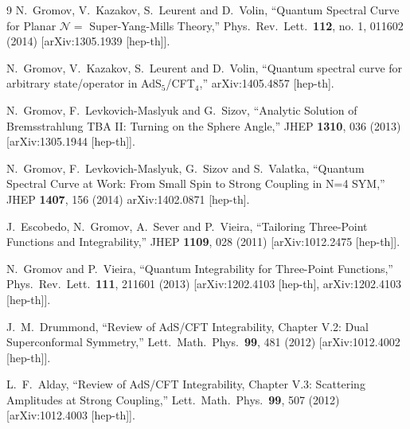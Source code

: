\documentclass[a4paper,11pt]{article}
\numberwithin{equation}{section}
\begin{document}
\begin{thebibliography} {9}
  N.~Gromov, V.~Kazakov, S.~Leurent and D.~Volin,
  ``Quantum Spectral Curve for Planar $\mathcal{N} =$ Super-Yang-Mills Theory,''
  Phys.\ Rev.\ Lett.\  {\bf 112}, no. 1, 011602 (2014)
  [arXiv:1305.1939 [hep-th]].

  N.~Gromov, V.~Kazakov, S.~Leurent and D.~Volin,
  ``Quantum spectral curve for arbitrary state/operator in AdS$_5$/CFT$_4$,''
  arXiv:1405.4857 [hep-th].

  N.~Gromov, F.~Levkovich-Maslyuk and G.~Sizov,
  ``Analytic Solution of Bremsstrahlung TBA II: Turning on the Sphere Angle,''
  JHEP {\bf 1310}, 036 (2013)
  [arXiv:1305.1944 [hep-th]].

  N.~Gromov, F.~Levkovich-Maslyuk, G.~Sizov and S.~Valatka,
  ``Quantum Spectral Curve at Work: From Small Spin to Strong Coupling in N=4 SYM,''
  JHEP {\bf 1407}, 156 (2014)
  arXiv:1402.0871 [hep-th].

  J.~Escobedo, N.~Gromov, A.~Sever and P.~Vieira,
  ``Tailoring Three-Point Functions and Integrability,''
  JHEP {\bf 1109}, 028 (2011)
  [arXiv:1012.2475 [hep-th]].

  N.~Gromov and P.~Vieira,
  ``Quantum Integrability for Three-Point Functions,''
  Phys.\ Rev.\ Lett.\  {\bf 111}, 211601 (2013)
  [arXiv:1202.4103 [hep-th], arXiv:1202.4103 [hep-th]].

  J.~M.~Drummond,
  ``Review of AdS/CFT Integrability, Chapter V.2: Dual Superconformal Symmetry,''
  Lett.\ Math.\ Phys.\  {\bf 99}, 481 (2012)
  [arXiv:1012.4002 [hep-th]].

  L.~F.~Alday,
  ``Review of AdS/CFT Integrability, Chapter V.3: Scattering Amplitudes at Strong Coupling,''
  Lett.\ Math.\ Phys.\  {\bf 99}, 507 (2012)
  [arXiv:1012.4003 [hep-th]].


\end{thebibliography}
\end{document}
